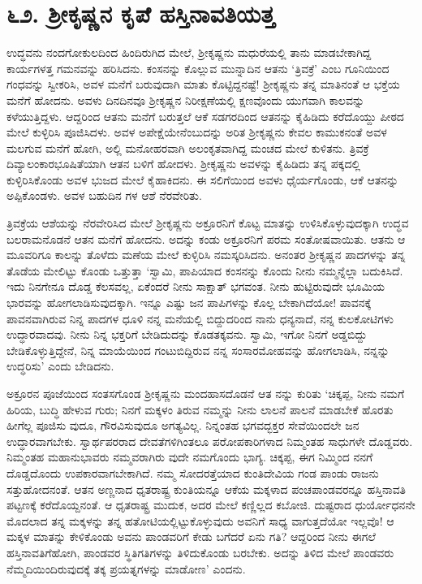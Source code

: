 
\chapter{೬೨. ಶ್ರೀಕೃಷ್ಣನ ಕೃಪೆ ಹಸ್ತಿನಾವತಿಯತ್ತ}

ಉದ್ಧವನು ನಂದಗೋಕುಲದಿಂದ ಹಿಂದಿರುಗಿದ ಮೇಲೆ, ಶ್ರೀಕೃಷ್ಣನು ಮಧುರೆಯಲ್ಲಿ ತಾನು ಮಾಡಬೇಕಾಗಿದ್ದ ಕಾರ್ಯಗಳತ್ತ ಗಮನವನ್ನು ಹರಿಸಿದನು. ಕಂಸನನ್ನು ಕೊಲ್ಲುವ ಮುನ್ನಾದಿನ ಆತನು ‘ತ್ರಿವಕ್ರೆ’ ಎಂಬ ಗೂನಿಯಿಂದ ಗಂಧವನ್ನು ಸ್ವೀಕರಿಸಿ, ಅವಳ ಮನೆಗೆ ಬರುವುದಾಗಿ ಮಾತು ಕೊಟ್ಟಿದ್ದನಷ್ಟೆ! ಶ್ರೀಕೃಷ್ಣನು ತನ್ನ ಮಾತಿನಂತೆ ಆ ಭಕ್ತೆಯ ಮನೆಗೆ ಹೋದನು. ಅವಳು ದಿನದಿನವೂ ಶ್ರೀಕೃಷ್ಣನ ನಿರೀಕ್ಷಣೆಯಲ್ಲಿ ಕ್ಷಣವೊಂದು ಯುಗವಾಗಿ ಕಾಲವನ್ನು ಕಳೆಯುತ್ತಿದ್ದಳು. ಆದ್ದರಿಂದ ಆತನು ಮನೆಗೆ ಬರುತ್ತಲೆ ಆಕೆ ಸಡಗರದಿಂದ ಆತನನ್ನು ಕೈಹಿಡಿದು ಕರೆದೊಯ್ದು ಪೀಠದ ಮೇಲೆ ಕುಳ್ಳಿರಿಸಿ ಪೂಜಿಸಿದಳು. ಅವಳ ಅಪೇಕ್ಷೆಯೇನೆಂಬುದನ್ನು ಅರಿತ ಶ್ರೀಕೃಷ್ಣನು ಕೇವಲ ಕಾಮುಕನಂತೆ ಅವಳ ಮಲಗುವ ಮನೆಗೆ ಹೋಗಿ, ಅಲ್ಲಿ ಮನೋಹರವಾಗಿ ಅಲಂಕೃತವಾಗಿದ್ದ ಮಂಚದ ಮೇಲೆ ಕುಳಿತನು. ತ್ರಿವಕ್ರೆ ದಿವ್ಯಾಲಂಕಾರಭೂಷಿತೆಯಾಗಿ ಆತನ ಬಳಿಗೆ ಹೋದಳು. ಶ್ರೀಕೃಷ್ಣನು ಅವಳನ್ನು ಕೈಹಿಡಿದು ತನ್ನ ಪಕ್ಕದಲ್ಲಿ ಕುಳ್ಳಿರಿಸಿಕೊಂಡು ಅವಳ ಭುಜದ ಮೇಲೆ ಕೈಹಾಕಿದನು. ಈ ಸಲಿಗೆಯಿಂದ ಅವಳು ಧೈರ್ಯಗೊಂಡು, ಆಕೆ ಆತನನ್ನು ಅಪ್ಪಿಕೊಂಡಳು. ಅವಳ ಬಹುದಿನ ಗಳ ಆಶೆ ನೆರವೇರಿತು.

ತ್ರಿವಕ್ರೆಯ ಆಶೆಯನ್ನು ನೆರವೇರಿಸಿದ ಮೇಲೆ ಶ್ರೀಕೃಷ್ಣನು ಅಕ್ರೂರನಿಗೆ ಕೊಟ್ಟ ಮಾತನ್ನು ಉಳಿಸಿಕೊಳ್ಳುವುದಕ್ಕಾಗಿ ಉದ್ಧವ ಬಲರಾಮನೊಡನೆ ಆತನ ಮನೆಗೆ ಹೋದನು. ಅದನ್ನು ಕಂಡು ಅಕ್ರೂರನಿಗೆ ಪರಮ ಸಂತೋಷವಾಯಿತು. ಆತನು ಆ ಮೂವರಿಗೂ ಕಾಲನ್ನು ತೊಳೆದು ಮಣೆಯ ಮೇಲೆ ಕುಳ್ಳಿರಿಸಿ ನಮಸ್ಕರಿಸಿದನು. ಅನಂತರ ಶ್ರೀಕೃಷ್ಣನ ಪಾದಗಳನ್ನು ತನ್ನ ತೊಡೆಯ ಮೇಲಿಟ್ಟು ಕೊಂಡು ಒತ್ತುತ್ತಾ ‘ಸ್ವಾಮಿ, ಪಾಪಿಯಾದ ಕಂಸನನ್ನು ಕೊಂದು ನೀನು ನಮ್ಮನ್ನೆಲ್ಲಾ ಬದುಕಿಸಿದೆ. ಇದು ನಿನಗೇನೂ ದೊಡ್ಡ ಕೆಲಸವಲ್ಲ, ಏಕೆಂದರೆ ನೀನು ಸಾಕ್ಷಾತ್ ಭಗವಂತ. ನೀನು ಹುಟ್ಟಿರುವುದೇ ಭೂಮಿಯ ಭಾರವನ್ನು ಹೋಗಲಾಡಿಸುವುದಕ್ಕಾಗಿ. ಇನ್ನೂ ಎಷ್ಟು ಜನ ಪಾಪಿಗಳನ್ನು ಕೊಲ್ಲ ಬೇಕಾಗಿದೆಯೋ! ಪಾವನಕ್ಕೆ ಪಾವನವಾಗಿರುವ ನಿನ್ನ ಪಾದಗಳ ಧೂಳಿ ನನ್ನ ಮನೆಯಲ್ಲಿ ಬಿದ್ದುದರಿಂದ ನಾನು ಧನ್ಯನಾದೆ, ನನ್ನ ಕುಲಕೋಟಿಗಳು ಉದ್ಧಾರವಾದವು. ನೀನು ನಿನ್ನ ಭಕ್ತರಿಗೆ ಬೇಡಿದುದನ್ನು ಕೊಡತಕ್ಕವನು. ಸ್ವಾಮಿ, ಇಗೋ ನಿನಗೆ ಅಡ್ಡಬಿದ್ದು ಬೇಡಿಕೊಳ್ಳುತ್ತಿದ್ದೇನೆ, ನಿನ್ನ ಮಾಯೆಯಿಂದ ಗಂಟುಬಿದ್ದಿರುವ ನನ್ನ ಸಂಸಾರಮೋಹವನ್ನು ಹೋಗಲಾಡಿಸಿ, ನನ್ನನ್ನು ಉದ್ಧರಿಸು’ ಎಂದು ಬೇಡಿದನು.

ಅಕ್ರೂರನ ಪೂಜೆಯಿಂದ ಸಂತಸಗೊಂಡ ಶ್ರೀಕೃಷ್ಣನು ಮಂದಹಾಸದೊಡನೆ ಆತ ನನ್ನು ಕುರಿತು ‘ಚಿಕ್ಕಪ್ಪ, ನೀನು ನಮಗೆ ಹಿರಿಯ, ಬುದ್ಧಿ ಹೇಳುವ ಗುರು; ನಿನಗೆ ಮಕ್ಕಳಂ ತಿರುವ ನಮ್ಮನ್ನು ನೀನು ಲಾಲನೆ ಪಾಲನೆ ಮಾಡಬೇಕೆ ಹೊರತು ಹೀಗೆಲ್ಲ ಪೂಜಿಸು ವುದೂ, ಗೌರವಿಸುವುದೂ ಅಗತ್ಯವಿಲ್ಲ. ನಿನ್ನಂತಹ ಭಗವದ್ಭಕ್ತರ ಸೇವೆಯಿಂದಲೇ ಜನ ಉದ್ಧಾರವಾಗಬೇಕು. ಸ್ವಾರ್ಥಪರರಾದ ದೇವತೆಗಳಿಗಿಂತಲೂ ಪರೋಪಕಾರಿಗಳಾದ ನಿಮ್ಮಂತಹ ಸಾಧುಗಳೇ ದೊಡ್ಡವರು. ನಿಮ್ಮಂತಹ ಮಹಾನುಭಾವರು ನಮ್ಮವರಾಗಿರು ವುದೇ ನಮಗೊಂದು ಭಾಗ್ಯ. ಚಿಕ್ಕಪ್ಪ, ಈಗ ನಿಮ್ಮಿಂದ ನನಗೆ ದೊಡ್ಡದೊಂದು ಉಪಕಾರವಾಗಬೇಕಾಗಿದೆ. ನಮ್ಮ ಸೋದರತ್ತೆಯಾದ ಕುಂತಿದೇವಿಯ ಗಂಡ ಪಾಂಡು ರಾಜನು ಸತ್ತುಹೋದನಂತೆ. ಆತನ ಅಣ್ಣನಾದ ಧೃತರಾಷ್ಟ್ರ ಕುಂತಿಯನ್ನೂ ಆಕೆಯ ಮಕ್ಕಳಾದ ಪಂಚಪಾಂಡವರನ್ನೂ ಹಸ್ತಿನಾವತಿ ಪಟ್ಟಣಕ್ಕೆ ಕರೆದೊಯ್ದನಂತೆ. ಆ ಧೃತರಾಷ್ಟ್ರ ಮುದುಕ, ಅದರ ಮೇಲೆ ಕಣ್ಣಿಲ್ಲದ ಕಬೋಜಿ. ದುಷ್ಟರಾದ ಧುರ್ಯೋಧನನೇ ಮೊದಲಾದ ತನ್ನ ಮಕ್ಕಳನ್ನು ತನ್ನ ಹತೋಟಿಯಲ್ಲಿಟ್ಟುಕೊಳ್ಳುವುದು ಅವನಿಗೆ ಸಾಧ್ಯ ವಾಗುತ್ತದೆಯೋ ಇಲ್ಲವೊ! ಆ ಮಕ್ಕಳ ಮಾತನ್ನು ಕೇಳಿಕೊಂಡು ಅವನು ಪಾಂಡವರಿಗೆ ಕೇಡು ಬಗೆದರೆ ಏನು ಗತಿ? ಆದ್ದರಿಂದ ನೀನು ಈಗಲೆ ಹಸ್ತಿನಾವತಿಗೆಹೋಗಿ, ಪಾಂಡವರ ಸ್ಥಿತಿಗತಿಗಳನ್ನು ತಿಳಿದುಕೊಂಡು ಬರಬೇಕು. ಅದನ್ನು ತಿಳಿದ ಮೇಲೆ ಪಾಂಡವರು ನೆಮ್ಮದಿಯಿಂದಿರುವುದಕ್ಕೆ ತಕ್ಕ ಪ್ರಯತ್ನಗಳನ್ನು ಮಾಡೋಣ’ ಎಂದನು.

